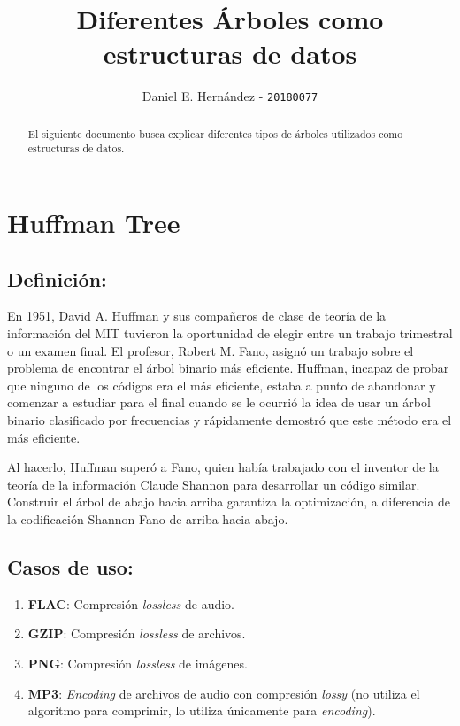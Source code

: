 \documentclass[]{article}
\title{\textbf{Diferentes Árboles como estructuras de datos}}
\author{Daniel E. Hernández - \texttt{20180077}}
\begin{document}
\maketitle

\begin{abstract}
El siguiente documento busca explicar diferentes tipos de árboles utilizados como estructuras de datos. 
\end{abstract}

\section{Huffman Tree}
	\subsection{Definición:}
		\par En 1951, David A. Huffman y sus compañeros de clase de teoría de la información del MIT tuvieron la oportunidad de elegir entre un trabajo trimestral o un examen final. El profesor, Robert M. Fano, asignó un trabajo sobre el problema de encontrar el árbol binario más eficiente. Huffman, incapaz de probar que ninguno de los códigos era el más eficiente, estaba a punto de abandonar y comenzar a estudiar para el final cuando se le ocurrió la idea de usar un árbol binario clasificado por frecuencias y rápidamente demostró que este método era el más eficiente.
		
		\par Al hacerlo, Huffman superó a Fano, quien había trabajado con el inventor de la teoría de la información Claude Shannon para desarrollar un código similar. Construir el árbol de abajo hacia arriba garantiza la optimización, a diferencia de la codificación Shannon-Fano de arriba hacia abajo.\cite{stixScientificAmericanArticle1991}
	\subsection{Casos de uso:}
		\begin{enumerate}
			\item \textbf{FLAC}: Compresión \textit{lossless} de audio.\cite{instituteofelectricalandelectronicsengineers20164thInternational2016}
			\item \textbf{GZIP}: Compresión \textit{lossless} de archivos. \cite{freesoftwarefundationGNUGzip2008}
			\item \textbf{PNG}: Compresión \textit{lossless} de imágenes. \cite{libpngPNGSpecificationDeflate}
			\item \textbf{MP3}: \textit{Encoding} de archivos de audio con compresión \textit{lossy} (no utiliza el algoritmo para comprimir, lo utiliza únicamente para \textit{encoding}). \cite{MP3TechOverview}
		\end{enumerate}
\end{document}
